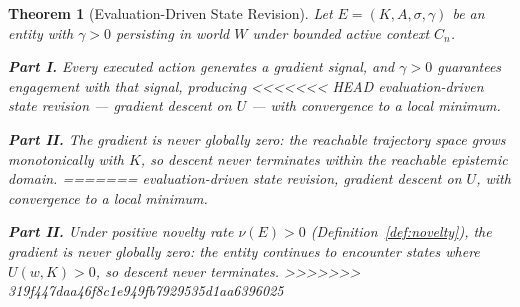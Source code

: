 \documentclass[11pt]{article}
\newtheorem{theorem}{Theorem}
\theoremstyle{definition}
\begin{document}
\begin{theorem}[Evaluation-Driven State Revision]
\label{thm:gradient}
Let $E = (K, A, \sigma, \gamma)$ be an entity with $\gamma > 0$ persisting in
world $W$ under bounded active context $C_n$.

\textbf{Part I.} Every executed action generates a gradient signal,
and $\gamma > 0$ guarantees engagement with that signal, producing
<<<<<<< HEAD
evaluation-driven state revision --- gradient descent on $U$ --- with
convergence to a local minimum.

\textbf{Part II.} The gradient is never globally zero: the reachable
trajectory space grows monotonically with $K$, so descent never
terminates within the reachable epistemic domain.
=======
evaluation-driven state revision, gradient descent on $U$, with
convergence to a local minimum.

\textbf{Part II.} Under positive novelty rate $\nu(E) > 0$
(Definition~\ref{def:novelty}), the gradient is never globally zero:
the entity continues to encounter states where $U(w,K) > 0$, so
descent never terminates.
>>>>>>> 319f447daa46f8c1e949fb7929535d1aa6396025
\end{theorem}
\end{document}
